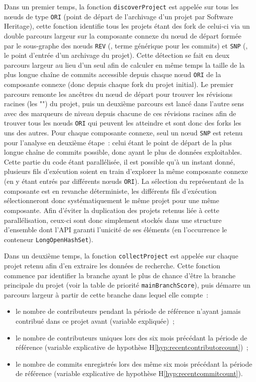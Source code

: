 Dans un premier temps, la fonction \texttt{discoverProject} est appelée sur tous les nœuds de type
\texttt{ORI} (point de départ de l'archivage d'un projet par Software Heritage), cette fonction identifie tous
les projets étant des \gls{fork} de celui-ci via un double parcours largeur sur la composante connexe du nœud
de départ formée par le sous-graphe des nœuds \texttt{REV} (, terme générique pour les
\glspl{commit}) et \texttt{SNP} (, le point d'entrée d'un archivage du projet). Cette détection
se fait en deux parcours largeur au lieu d'un seul afin de calculer en même temps la taille de la plus longue
chaîne de \glspl{commit} accessible depuis chaque nœud \texttt{ORI} de la composante connexe (donc depuis
chaque \gls{fork} du projet initial). Le premier parcours remonte les ancêtres du nœud de départ pour trouver
les révisions racines (les "") du projet, puis un deuxième parcours est lancé dans
l'autre sens avec des marqueurs de niveau depuis chacune de ces révisions racines afin de trouver tous les
nœuds \texttt{ORI} qui peuvent les atteindre et sont donc des \glspl{fork} les uns des autres. Pour chaque
composante connexe, seul un nœud \texttt{SNP} est retenu pour l'analyse en deuxième étape : celui étant le
point de départ de la plus longue chaîne de \glspl{commit} possible, donc ayant le plus de données
exploitables. Cette partie du code étant parallélisée, il est possible qu'à un instant donné, plusieurs
fils d'exécution soient en train d'explorer la même composante connexe (en y étant entrés par différents nœuds
\texttt{ORI}). La sélection du représentant de la composante est en revanche déterministe, les différents fils
d'exécution sélectionneront donc systématiquement le même projet pour une même composante. Afin d'éviter la
duplication des projets retenus liée à cette parallélisation, ceux-ci sont donc simplement stockés dans une
structure d'ensemble dont l'API garanti l'unicité de ses éléments (en l'occurrence le conteneur
\texttt{LongOpenHashSet}).

Dans un deuxième temps, la fonction \texttt{collectProject} est appelée sur chaque projet retenu afin d'en
extraire les données de recherche. Cette fonction commence par identifier la branche ayant le plus de chance
d'être la branche principale du projet (voir la table de priorité \texttt{mainBranchScore}), puis démarre un
parcours largeur à partir de cette branche dans lequel elle compte :

\begin{itemize}
    \item le nombre de contributeurs pendant la période de référence n'ayant jamais contribué dans ce projet
        avant (variable expliquée) ;
    \item le nombre de contributeurs uniques lors des six mois précédant la période de référence (variable
        explicative de hypothèse H\ref{hyp:recentcontributorcount}) ;
    \item le nombre de \glspl{commit} enregistrés lors des même six mois précédant la période de référence
        (variable explicative de hypothèse H\ref{hyp:recentcommitcount}).
\end{itemize}

